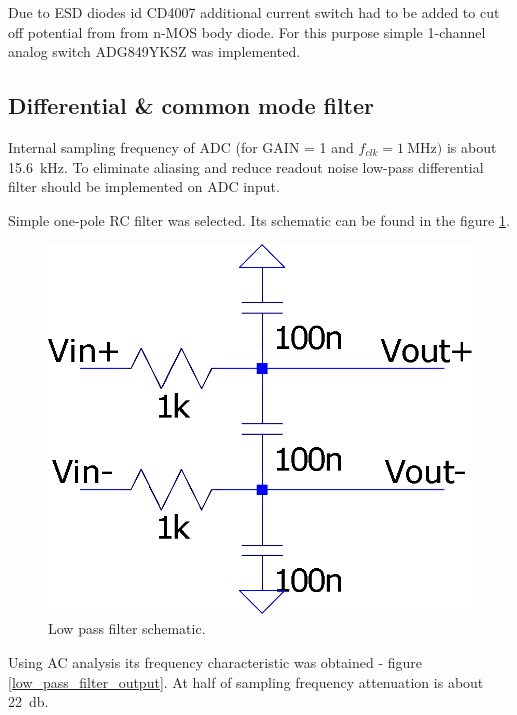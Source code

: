         Due to ESD diodes id CD4007 additional current switch had to be added to cut off potential from from n-MOS body diode. For this purpose simple 1-channel analog switch ADG849YKSZ was implemented.

    \subsection{Differential \& common mode filter}
        Internal sampling frequency of ADC (for GAIN = 1 and $f_{clk} = \SI{1}{\mega\hertz})$ is about \SI{15.6}{\kilo\hertz}. To eliminate aliasing and reduce readout noise low-pass differential filter should be implemented on ADC input.

        Simple one-pole RC filter was selected. Its schematic can be found in the figure \ref{low_pass_filter}.

        \begin{figure}[H]
            \centering
            \includegraphics[width=0.3\paperwidth]{img/06/low_pass_filter.eps}
            \caption{Low pass filter schematic.}
            \label{low_pass_filter}
        \end{figure}

        Using AC analysis its frequency characteristic was obtained - figure \ref{low_pass_filter_output}. At half of sampling frequency attenuation is about \SI{22}{\decibel}.

